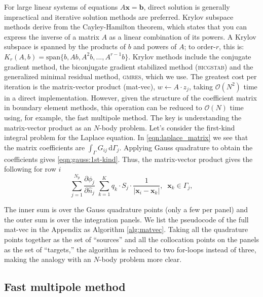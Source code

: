 \documentclass[final,3p,times]{elsarticle}
\renewcommand{\O}[1]{\mathcal{O}(#1)}
\newcommand{\gmres}{\textsc{gmres}\xspace}
\newcommand{\di}[1]{\text{d}#1}
\newcommand{\partiald}[2]{\frac{\partial #1}{\partial #2}}
\newcommand{\nhat}{\hat{n}}
\newcommand{\vect}[1]{\mathbf{#1}}
\begin{document}
For large linear systems of equations $A\vect{x}=\vect{b}$, direct solution is generally impractical and iterative solution methods are preferred. Krylov subspace methods derive from the Cayley-Hamilton theorem, which states that you can express the inverse of a  matrix $A$ as a linear combination of its powers. A Krylov subspace is spanned by the products of $b$ and powers of $A$; to order-$r$, this is: $K_{r}(A,b) = \text{span}\{ b, Ab, A^{2}b, ..., A^{r-1}b\}$.
Krylov methods include the conjugate gradient method, the biconjugate gradient stabilized method (\textsc{bicgstab}) and the generalized minimal residual method, \gmres \cite{SaadSchultz1986}, which we use. The greatest cost per iteration is the matrix-vector product (mat-vec), $w\gets A\cdot z_j$, taking $\O{N^{2}}$ time in a direct implementation. However, given the structure of the coefficient matrix in boundary element methods, this operation can be reduced to $\O{N}$ time using, for example, the fast multipole method.
The key is understanding the matrix-vector product as an $N$-body problem. Let's consider the first-kind integral problem for the Laplace equation. In \eqref{eqn:laplace_matrix} we see that the matrix coefficients are $\int_{\Gamma} G_{ij}\,\di{\Gamma_j}$. Applying Gauss quadrature to obtain the coefficients gives \eqref{eqn:gauss:1st-kind}. Thus, the matrix-vector product gives the following  for row $i$
%
\begin{equation}\label{eqn:matvec-onerow}
	\sum_{j=1}^{N_p}  \partiald{\phi_j}{\nhat_j}\; \sum_{k=1}^{K} q_k\cdot S_j\cdot \frac{1}{|\vect{x}_i-\vect{x}_k|},\;\;\vect{x}_k \in \Gamma_j, 
\end{equation}

\noindent
The inner sum is over the Gauss quadrature points (only a few per panel) and the outer sum is over the integration panels. We list the pseudocode of the full mat-vec in the Appendix as Algorithm \ref{alg:matvec}. Taking all the quadrature points together as the set of ``sources'' and all the collocation points on the panels as the set of ``targets,'' the algorithm is reduced to two for-loops instead of three, making the analogy with an $N$-body problem more clear.


\subsection{Fast multipole method}
\end{document}
